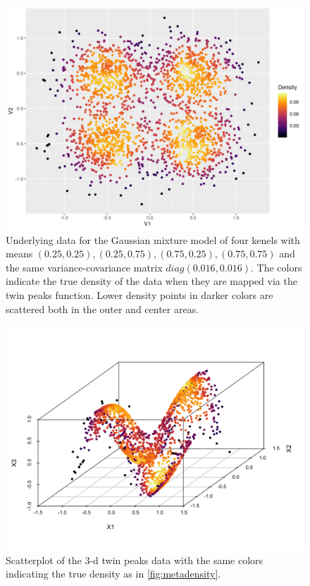 \documentclass[11pt,a4paper,]{article}
\begin{document}
\begin{figure}

{\centering \includegraphics[width=0.8\linewidth]{figures/truedensity_twinpeaks_dc_labv} 

}

\caption{Underlying data for the Gaussian mixture model of four kenels with means $(0.25, 0.25), (0.25, 0.75), (0.75, 0.25), (0.75, 0.75)$ and the same variance-covariance matrix $diag(0.016, 0.016)$. The colors indicate the true density of the data when they are mapped via the twin peaks function. Lower density points in darker colors are scattered both in the outer and center areas.}\label{fig:metadensity}
\end{figure}



\begin{figure}

{\centering \includegraphics[width=0.8\linewidth]{figures/scatterplot3d_twinpeaks_dc} 

}

\caption{Scatterplot of the 3-d twin peaks data with the same colors indicating the true density as in \autoref{fig:metadensity}.}\label{fig:twinpeaks3d}
\end{figure}
\end{document}

